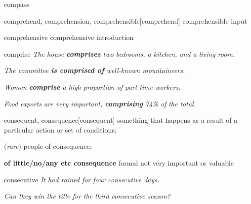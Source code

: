 \begin{DefWord}{compass}
\end{DefWord}

\begin{DefWord}{comprehend, comprehension, comprehensible}[comprehend]
    comprehensible input
\end{DefWord}

\begin{DefWord}{comprehensive}
    comprehensive introduction
\end{DefWord}

\begin{DefWord}{comprise}
    \textit{The house \textbf{comprises} two bedrooms, a kitchen, and a living room.} 
    
    \textit{The committee \textbf{is comprised of} well-known mountaineers. }
    
    \textit{Women \textbf{comprise} a high proportion of part-time workers.} 
    
    \textit{Food exports are very important, \textbf{comprising} 74\% of the total.}
\end{DefWord}

\begin{DefWord}{consequent, consequence}[consequent]
    something that happens as a result of a particular action or set of conditions; 
    
    (\textit{rare}) people of consequence; 
    
    \textbf{of little/no/any etc consequence} formal not very important or valuable
\end{DefWord}

\begin{DefWord}{consecutive}
   \textit{ It had rained for four consecutive days.}

    \textit{Can they win the title for the third consecutive season?}
\end{DefWord}


